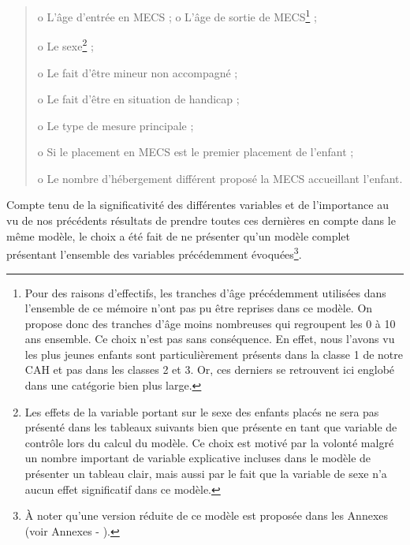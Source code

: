 \documentclass[
  12,
  a4paper,
]{report}
\begin{document}
\begin{quote}
o L'âge d'entrée en MECS ; o L'âge de sortie de MECS\footnote{Pour des
  raisons d'effectifs, les tranches d'âge précédemment utilisées dans
  l'ensemble de ce mémoire n'ont pas pu être reprises dans ce modèle. On
  propose donc des tranches d'âge moins nombreuses qui regroupent les 0
  à 10 ans ensemble. Ce choix n'est pas sans conséquence. En effet, nous
  l'avons vu les plus jeunes enfants sont particulièrement présents dans
  la classe 1 de notre CAH et pas dans les classes 2 et 3. Or, ces
  derniers se retrouvent ici englobé dans une catégorie bien plus large.}
;

o Le sexe\footnote{Les effets de la variable portant sur le sexe des
  enfants placés ne sera pas présenté dans les tableaux suivants bien
  que présente en tant que variable de contrôle lors du calcul du
  modèle. Ce choix est motivé par la volonté malgré un nombre important
  de variable explicative incluses dans le modèle de présenter un
  tableau clair, mais aussi par le fait que la variable de sexe n'a
  aucun effet significatif dans ce modèle.} ;

o Le fait d'être mineur non accompagné ;

o Le fait d'être en situation de handicap ;

o Le type de mesure principale ;

o Si le placement en MECS est le premier placement de l'enfant ;

o Le nombre d'hébergement différent proposé la MECS accueillant
l'enfant.
\end{quote}

Compte tenu de la significativité des différentes variables et de
l'importance au vu de nos précédents résultats de prendre toutes ces
dernières en compte dans le même modèle, le choix a été fait de ne
présenter qu'un modèle complet présentant l'ensemble des variables
précédemment évoquées\footnote{À noter qu'une version réduite de ce
  modèle est proposée dans les Annexes (voir Annexes - ).}.
\end{document}
